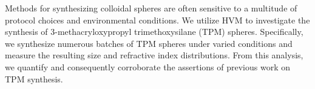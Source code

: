 Methods for synthesizing colloidal spheres are often sensitive
to a multitude of protocol choices and environmental conditions. We
utilize HVM to investigate the synthesis of 3-methacryloxypropyl
trimethoxysilane (TPM) spheres. Specifically, we synthesize numerous
batches of TPM spheres under varied conditions and measure the
resulting size and refractive index distributions. From this analysis,
we quantify and consequently corroborate the assertions of previous
work on TPM synthesis.





